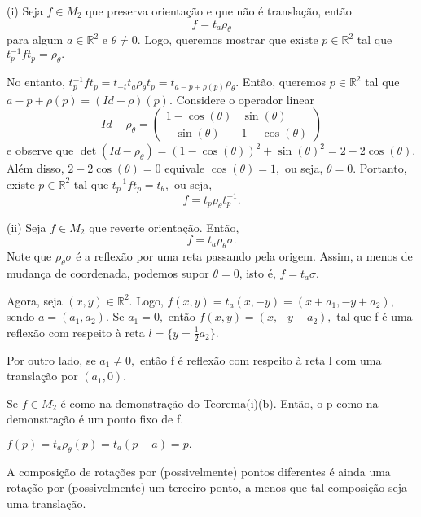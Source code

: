 \documentclass[algebra_notes.tex]{subfiles}
\begin{document}
\begin{proof*}
	(i) Seja $f\in M_{2}$ que preserva orientação e que não é translação, então
	$$
		f = t_{a}\rho_{\theta }
	$$
	para algum $a\in \mathbb{R}^{2}$ e $\theta \neq0.$ Logo, queremos mostrar que existe $p\in \mathbb{R}^{2}$
	tal que $t_{p}^{-1}ft_{p}=\rho_{\theta }.$

	No entanto, $t_{p}^{-1}ft_{p}=t_{-t}t_{a}\rho _{\theta }t_{p} = t_{a-p+\rho (p)}\rho _{\theta }.$
	Então, queremos $p\in \mathbb{R}^{2}$ tal que $a - p + \rho (p) = (Id - \rho )(p).$ Considere o operador linear
	$$
		Id - \rho _{\theta } = \begin{pmatrix}
			1 - \cos{(\theta )} & \sin{(\theta )}   \\
			-\sin{(\theta )}    & 1-\cos{(\theta )}
		\end{pmatrix}
	$$
	e observe que $\det{(Id-\rho _{\theta })} = (1-\cos{(\theta )})^{2} +\sin{(\theta )}^{2} = 2-2\cos{(\theta )}.$
	Além disso, $2-2\cos{(\theta )} = 0$ equivale $\cos{(\theta )}=1,$ ou seja, $\theta =0.$ Portanto, existe
	$p\in \mathbb{R}^{2}$ tal que $t_{p}^{-1}ft_{p}=t_{\theta },$ ou seja,
	$$
		f = t_{p}\rho _{\theta }t_{p}^{-1}.
	$$

	(ii) Seja $f\in M_{2}$ que reverte orientação. Então,
	$$
		f = t_a\rho _{\theta }\sigma.
	$$
	Note que $\rho _{\theta }\sigma $ é a reflexão por uma reta passando pela origem. Assim, a menos de mudança de coordenada,
	podemos supor $\theta =0$, isto é, $f = t_{a}\sigma .$

	Agora, seja $(x, y)\in \mathbb{R}^{2}.$ Logo, $f(x,y) = t_{a}(x, -y)=(x+a_{1}, -y+a_{2}),$ sendo $a = (a_{1}, a_{2})$.
	Se $a_{1}=0,$ então $f(x, y) = (x, -y+a_{2}),$ tal que f é uma reflexão com respeito à reta $l=\{y=\frac{1}{2}a_{2}\}.$

	Por outro lado, se $a_{1}\neq0,$ então f é reflexão com respeito à reta l com uma translação por $(a_{1}, 0).$ \qedsymbol
\end{proof*}
\begin{crl*}
	Se $f\in M_{2}$ é como na demonstração do Teorema(i)(b). Então, o p como na demonstração é um ponto fixo de f.
\end{crl*}
\begin{proof*}
	$f(p)=t_{a}\rho _{\theta }(p) = t_{a}(p-a) = p.$ \qedsymbol
\end{proof*}
\begin{crl*}
	A composição de rotações por (possivelmente) pontos diferentes é ainda uma rotação por (possivelmente) um terceiro ponto,
	a menos que tal composição seja uma translação.
\end{crl*}
\end{document}
